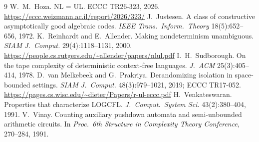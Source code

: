 \documentclass[11pt,letterpaper]{article}
\theoremstyle{definition}
\theoremstyle{remark}
\begin{document}
\begin{thebibliography}{9}
 W.~M.~Hoza. NL = UL. ECCC TR26-323, 2026. \url{https://eccc.weizmann.ac.il/report/2026/323/}
 J.~Justesen. A class of constructive asymptotically good algebraic codes. \emph{IEEE Trans.\ Inform.\ Theory} 18(5):652--656, 1972.
 K.~Reinhardt and E.~Allender. Making nondeterminism unambiguous. \emph{SIAM J.\ Comput.} 29(4):1118--1131, 2000. \url{https://people.cs.rutgers.edu/~allender/papers/nlul.pdf}
 I.~H.~Sudborough. On the tape complexity of deterministic context-free languages. \emph{J.\ ACM} 25(3):405--414, 1978.
 D.~van Melkebeek and G.~Prakriya. Derandomizing isolation in space-bounded settings. \emph{SIAM J.\ Comput.} 48(3):979--1021, 2019; ECCC TR17-052. \url{https://pages.cs.wisc.edu/~dieter/Papers/r-ul-eccc.pdf}
 H.~Venkateswaran. Properties that characterize LOGCFL. \emph{J.\ Comput.\ System Sci.} 43(2):380--404, 1991.
 V.~Vinay. Counting auxiliary pushdown automata and semi-unbounded arithmetic circuits. In \emph{Proc.\ 6th Structure in Complexity Theory Conference}, 270--284, 1991.
\end{thebibliography}
\end{document}
